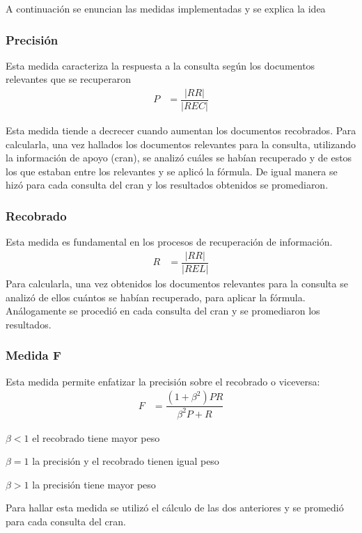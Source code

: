 \documentclass[runningheads]{llncs}
\begin{document}
	A continuaci\'on se enuncian las medidas implementadas y se explica la idea
\subsubsection{Precisi\'on }

	Esta medida caracteriza la respuesta a la consulta seg\'un los documentos relevantes que se recuperaron
	\begin{align*}
	P&=\dfrac{|RR|}{|REC|}
	\end{align*}
	
	Esta medida tiende a decrecer cuando aumentan los documentos recobrados. Para calcularla, una vez hallados los documentos relevantes para la consulta, utilizando la informaci\'on de apoyo (cran), se analiz\'o cu\'ales se hab\'ian recuperado y de estos los que estaban entre los relevantes y se aplic\'o la f\'ormula. De igual manera se hiz\'o para cada consulta del cran y los resultados obtenidos se promediaron. 

\subsubsection{Recobrado}

Esta medida es fundamental en los procesos de recuperación de información.
	\begin{align*}
	R&=\dfrac{|RR|}{|REL|}
	\end{align*}
	Para calcularla, una vez obtenidos los documentos relevantes para la consulta se analizó de ellos cuántos se habían recuperado, para aplicar la fórmula. Análogamente se procedió en cada consulta del cran y se promediaron los resultados.
\subsubsection{Medida F}

Esta medida permite enfatizar la precisión sobre el recobrado o viceversa:
	\begin{align*}
	F&=\dfrac{(1+ \beta^{2})PR}{\beta^{2} P + R}
	\end{align*}
	
$ \beta < 1 $ el recobrado tiene mayor peso

$ \beta = 1 $ la precisión y el recobrado tienen igual peso

$ \beta > 1 $ la precisión tiene mayor peso

Para hallar esta medida se utilizó el cálculo de las dos anteriores  y se promedió para cada consulta del cran.
\end{document}
